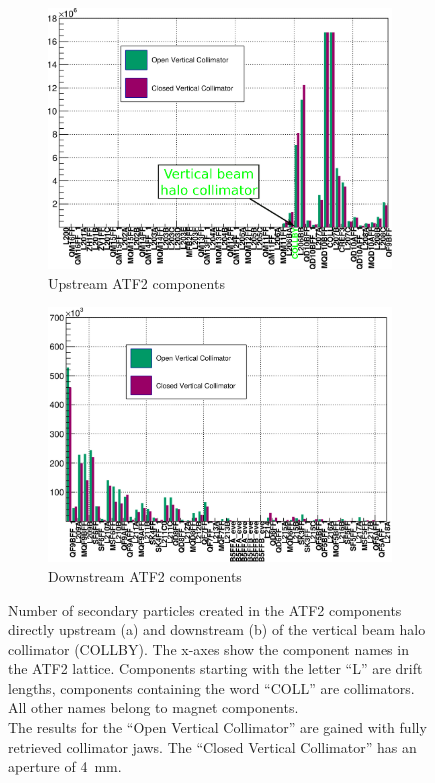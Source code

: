 \begin{figure}
\centering
\begin{subfigure}[b]{0.49\textwidth}
 \centering
 \includegraphics[width=\textwidth]{Figures/ATF/TracksPerModel_firstPart.png}
 \caption{Upstream ATF2 components}
\end{subfigure}
\hfill
\begin{subfigure}[b]{0.49\textwidth}
  \centering
 \includegraphics[width=\textwidth]{Figures/ATF/TracksPerModel_secondPart.png}
 \caption{Downstream ATF2 components}
\end{subfigure}
\caption[Number of secondary particles created in the ATF2 components]{Number of secondary particles created in the ATF2 components directly upstream (a) and downstream (b) of the vertical beam halo collimator (COLLBY).
The x-axes show the component names in the ATF2 lattice.
Components starting with the letter ``L'' are drift lengths, components containing the word ``COLL'' are collimators.
All other names belong to magnet components.
\\The results for the ``Open Vertical Collimator'' are gained with fully retrieved collimator jaws.
The ``Closed Vertical Collimator'' has an aperture of \SI[detect-all]{4}{\milli\meter}.
}
\label{fig:Collimator_model}
\end{figure}

